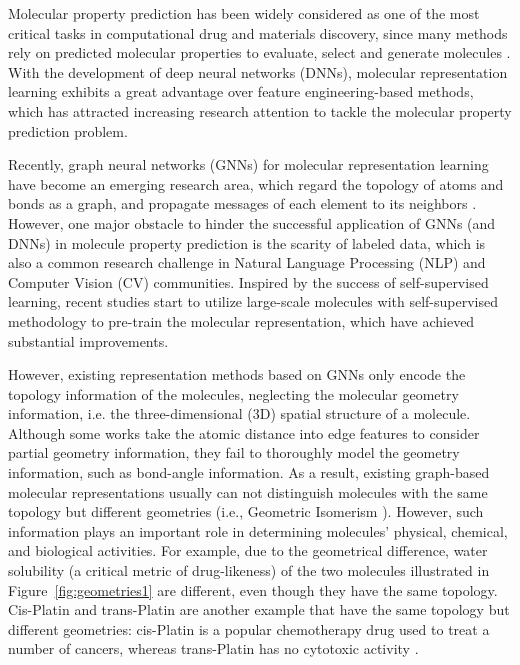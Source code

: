 \documentclass{article}
\begin{document}
Molecular property prediction has been widely considered as one of the most critical tasks in computational drug and materials discovery, since many methods rely on predicted molecular properties to evaluate, select and generate molecules \cite{shen2020molecular,wieder2020compact}. 
With the development of deep neural networks (DNNs), molecular representation learning exhibits a great advantage over feature engineering-based methods, which has attracted increasing research attention to tackle the molecular property prediction problem.

Recently, graph neural networks (GNNs) for molecular representation learning have become an emerging research area, which regard the topology of atoms and bonds as a graph, and propagate messages of each element to its neighbors \cite{DBLP:journals/corr/abs-2004-08919,DBLP:conf/nips/RongBXX0HH20,DBLP:journals/corr/abs-1909-00259,DBLP:conf/icdm/ShuiK20}.
However, one major obstacle to hinder the successful application of GNNs (and DNNs) in molecule property prediction is the scarity of labeled data, which is also a common research challenge in Natural Language Processing (NLP) \cite{DBLP:conf/naacl/DevlinCLT19,DBLP:journals/corr/abs-2006-03654} and Computer Vision (CV) \cite{DBLP:journals/corr/DoerschGE15,gidaris2018unsupervised} communities.
Inspired by the success of self-supervised learning, recent studies \cite{DBLP:conf/iclr/HuLGZLPL20,DBLP:conf/nips/RongBXX0HH20} start to utilize large-scale molecules with self-supervised methodology to pre-train the molecular representation, which have achieved
substantial improvements.






However, existing representation methods based on GNNs only encode the topology information of the molecules, neglecting the molecular geometry information, i.e. the three-dimensional (3D) spatial structure of a molecule. Although some works \cite{DBLP:conf/nips/SchuttKFCTM17,DBLP:journals/corr/abs-2102-07933} take the atomic distance into edge features to consider partial geometry information, they fail to thoroughly model the geometry information, such as bond-angle information. As a result, existing graph-based molecular representations usually can not distinguish molecules with the same topology but different geometries (i.e., Geometric Isomerism \cite{farrell1995effects}). However, such information plays an important role in determining molecules' physical, chemical, and biological activities. For example, due to the geometrical difference, water solubility (a critical metric of drug-likeness) of the two molecules illustrated in Figure~\ref{fig:geometries1} are different, even though they have the same topology. Cis-Platin and trans-Platin are another example that have the same topology but different geometries: cis-Platin is a popular chemotherapy drug used to treat a number of cancers, whereas trans-Platin has no cytotoxic activity \cite{peleg2002interactions}.
\end{document}
